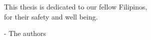 \begin{dedication}
\null{}

\begin{flushright}
	\begin{calligra}
	\Large 
	This thesis is dedicated to our fellow Filipinos,\\
	for their safety and well being.
	\end{calligra}

- The authors
\end{flushright}


\end{dedication}